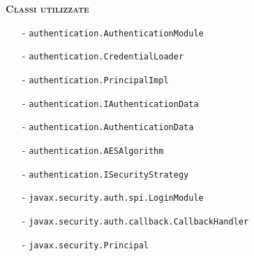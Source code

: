 \begin{description}
  \item{\scshape\bfseries Classi utilizzate}
  \begin{itemize}
    \item[-] \texttt{authentication.AuthenticationModule}
	\item[-] \texttt{authentication.CredentialLoader}
	\item[-] \texttt{authentication.PrincipalImpl}
	\item[-] \texttt{authentication.IAuthenticationData}
 	\item[-] \texttt{authentication.AuthenticationData}
 	\item[-] \texttt{authentication.AESAlgorithm}
  	\item[-] \texttt{authentication.ISecurityStrategy}
 	\item[-] \texttt{javax.security.auth.spi.LoginModule}
 	\item[-] \texttt{javax.security.auth.callback.CallbackHandler}
 	\item[-] \texttt{javax.security.Principal}
  \end{itemize}

\end{description}



